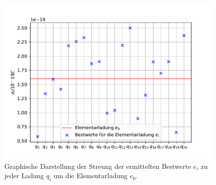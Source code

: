 \begin{figure}
  \centering
  \includegraphics{../Messdaten/scattering.pdf}
  \caption{Graphische Darstellung der Streung der ermittelten Bestwerte $e_i$ zu jeder Ladung $q_i$ um die Elementarladung $e_0$.}
  \label{fig: streuung}
\end{figure}
